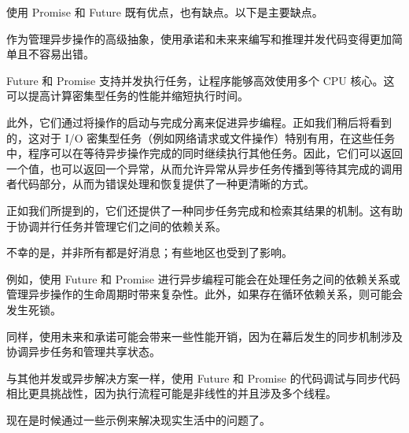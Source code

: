 使用 Promise 和 Future 既有优点，也有缺点。以下是主要缺点。


作为管理异步操作的高级抽象，使用承诺和未来来编写和推理并发代码变得更加简单且不容易出错。

Future 和 Promise 支持并发执行任务，让程序能够高效使用多个 CPU 核心。这可以提高计算密集型任务的性能并缩短执行时间。

此外，它们通过将操作的启动与完成分离来促进异步编程。正如我们稍后将看到的，这对于 I/O 密集型任务（例如网络请求或文件操作）特别有用，在这些任务中，程序可以在等待异步操作完成的同时继续执行其他任务。因此，它们可以返回一个值，也可以返回一个异常，从而允许异常从异步任务传播到等待其完成的调用者代码部分，从而为错误处理和恢复提供了一种更清晰的方式。

正如我们所提到的，它们还提供了一种同步任务完成和检索其结果的机制。这有助于协调并行任务并管理它们之间的依赖关系。


不幸的是，并非所有都是好消息；有些地区也受到了影响。

例如，使用 Future 和 Promise 进行异步编程可能会在处理任务之间的依赖关系或管理异步操作的生命周期时带来复杂性。此外，如果存在循环依赖关系，则可能会发生死锁。

同样，使用未来和承诺可能会带来一些性能开销，因为在幕后发生的同步机制涉及协调异步任务和管理共享状态。

与其他并发或异步解决方案一样，使用 Future 和 Promise 的代码调试与同步代码相比更具挑战性，因为执行流程可能是非线性的并且涉及多个线程。

现在是时候通过一些示例来解决现实生活中的问题了。